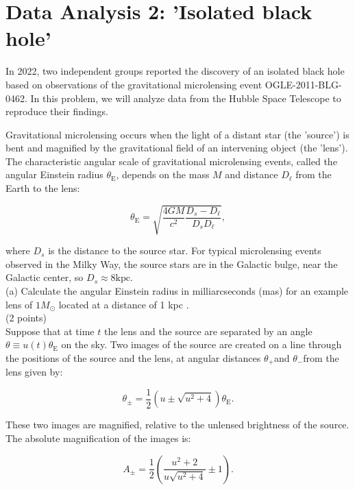 \documentclass[10pt]{article}
\begin{document}
\section*{Data Analysis 2: 'Isolated black hole'}
In 2022, two independent groups reported the discovery of an isolated black hole based on observations of the gravitational microlensing event OGLE-2011-BLG-0462. In this problem, we will analyze data from the Hubble Space Telescope to reproduce their findings.

Gravitational microlensing occurs when the light of a distant star (the 'source') is bent and magnified by the gravitational field of an intervening object (the 'lens'). The characteristic angular scale of gravitational microlensing events, called the angular Einstein radius $\theta_{\mathrm{E}}$, depends on the mass $M$ and distance $D_{\ell}$ from the Earth to the lens:

$$
\theta_{\mathrm{E}}=\sqrt{\frac{4 G M}{c^{2}} \frac{D_{s}-D_{\ell}}{D_{s} D_{\ell}}},
$$

where $D_{s}$ is the distance to the source star. For typical microlensing events observed in the Milky Way, the source stars are in the Galactic bulge, near the Galactic center, so $D_{s} \approx 8 \mathrm{kpc}$.\\
(a) Calculate the angular Einstein radius in milliarcseconds (mas) for an example lens of $1 M_{\odot}$ located at a distance of 1 kpc .\\
(2 points)\\
Suppose that at time $t$ the lens and the source are separated by an angle $\theta \equiv u(t) \theta_{\mathrm{E}}$ on the sky. Two images of the source are created on a line through the positions of the source and the lens, at angular distances $\theta_{+}$and $\theta_{-}$from the lens given by:

$$
\theta_{ \pm}=\frac{1}{2}\left(u \pm \sqrt{u^{2}+4}\right) \theta_{\mathrm{E}} .
$$

These two images are magnified, relative to the unlensed brightness of the source. The absolute magnification of the images is:

$$
A_{ \pm}=\frac{1}{2}\left(\frac{u^{2}+2}{u \sqrt{u^{2}+4}} \pm 1\right) .
$$
\end{document}
